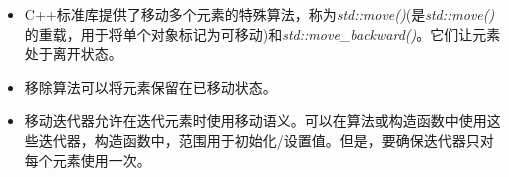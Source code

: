 \begin{itemize}
	\item C++标准库提供了移动多个元素的特殊算法，称为\textit{std::move()}(是\textit{std::move()}的重载，用于将单个对象标记为可移动)和\textit{std::move_backward()}。它们让元素处于离开状态。
	\item 移除算法可以将元素保留在已移动状态。
	\item 移动迭代器允许在迭代元素时使用移动语义。可以在算法或构造函数中使用这些迭代器，构造函数中，范围用于初始化/设置值。但是，要确保迭代器只对每个元素使用一次。
\end{itemize}


